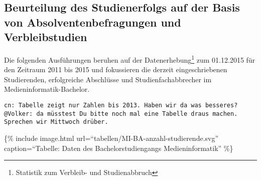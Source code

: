 \subsection{Beurteilung des Studienerfolgs auf der Basis von
Absolventenbefragungen und
Verbleibstudien}\label{beurteilung-des-studienerfolgs-auf-der-basis-von-absolventenbefragungen-und-verbleibstudien}

Die folgenden Ausführungen beruhen auf der Datenerhebung\footnote{Statistik
  zum Verbleib- und Studienabbruch} zum 01.12.2015 für den Zeitraum 2011
bis 2015 und fokussieren die derzeit eingeschriebenen Studierenden,
erfolgreiche Abschlüsse und Studienfachabbrecher im
Medieninformatik-Bachelor.

\begin{verbatim}
cn: Tabelle zeigt nur Zahlen bis 2013. Haben wir da was besseres?
@Volker: da müsstest Du bitte noch mal eine Tabelle draus machen. Sprechen wir Mittwoch drüber.
\end{verbatim}

\{\% include image.html url=``tabellen/MI-BA-anzahl-studierende.svg''
caption=``Tabelle: Daten des Bachelorstudiengangs Medieninformatik''
\%\}

